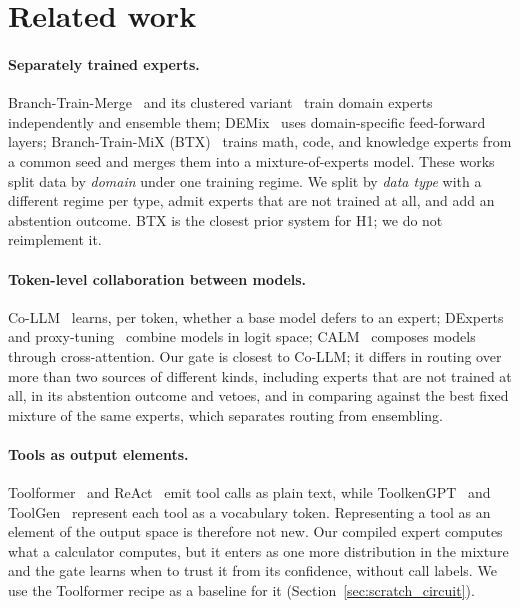 \documentclass[10pt]{article}
\begin{document}
\section{Related work}
\label{sec:related}

\paragraph{Separately trained experts.} Branch-Train-Merge~\citep{li2022btm} and its clustered
variant~\citep{gururangan2023cbtm} train domain experts independently and ensemble them;
DEMix~\citep{gururangan2022demix} uses domain-specific feed-forward layers; Branch-Train-MiX
(BTX)~\citep{sukhbaatar2024btx} trains math, code, and knowledge experts from a common seed and
merges them into a mixture-of-experts model. These works split data by \emph{domain} under one
training regime. We split by \emph{data type} with a different regime per type, admit experts
that are not trained at all, and add an abstention outcome. BTX is the closest prior system for H1; we do not reimplement it.

\paragraph{Token-level collaboration between models.} Co-LLM~\citep{shen2024colm} learns, per
token, whether a base model defers to an expert; DExperts~\citep{liu2021dexperts} and
proxy-tuning~\citep{liu2024proxy} combine models in logit space; CALM~\citep{bansal2024calm}
composes models through cross-attention. Our gate is closest to Co-LLM; it differs in routing
over more than two sources of different kinds, including experts that are not trained at all,
in its abstention outcome and vetoes, and in comparing against the best fixed mixture of the
same experts, which separates routing from ensembling.

\paragraph{Tools as output elements.} Toolformer~\citep{schick2023toolformer} and
ReAct~\citep{yao2023react} emit tool calls as plain text, while ToolkenGPT~\citep{hao2023toolkengpt} and
ToolGen~\citep{wang2024toolgen} represent each tool as a vocabulary token. Representing a tool as
an element of the output space is therefore not new. Our compiled expert computes what a
calculator computes, but it enters as one more distribution in the mixture and the gate learns
when to trust it from its confidence, without call labels. We use the Toolformer recipe as a
baseline for it (Section~\ref{sec:scratch_circuit}).
\end{document}
